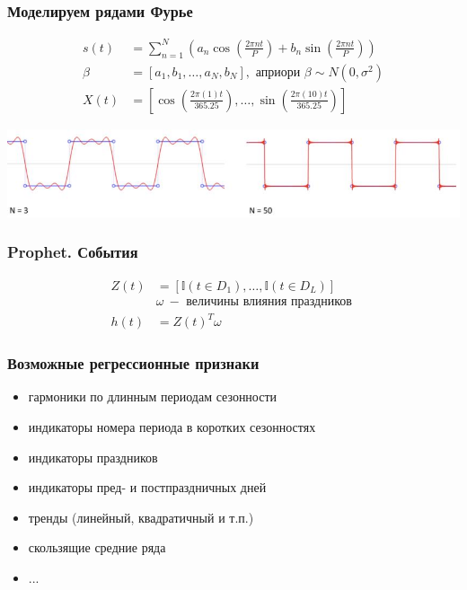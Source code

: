 \documentclass[fullscreen=true, bookmarks=true, hyperref={pdfencoding=unicode}]{beamer}
\begin{document}
\begin{frame}
  \frametitle{Моделируем рядами Фурье}

  \begin{align*}
    s(t) &= \sum\limits_{n=1}^N \left(a_n \cos\left(\frac{2\pi nt}{P}\right) + b_n \sin\left(\frac{2\pi nt}{P} \right) \right) \\
    \beta &= [a_1, b_1, \dots, a_N, b_N], \text{ априори } \beta \sim N(0, \sigma^2)\\
    X(t) &= \left[ \cos\left(\frac{2\pi(1)t}{365.25}\right), \dots, \sin\left(\frac{2\pi(10)t}{365.25}\right) \right]
  \end{align*}

  \vspace{1cm}
  \begin{center}
    \includegraphics[keepaspectratio,
                   width=.8\paperwidth]{fourie.jpg}
  \end{center}

\end{frame}


\begin{frame}
  \frametitle{Prophet. События}

  \begin{align*}
    Z(t) &= [\mathbb{I}(t \in D_1), \dots, \mathbb{I}(t \in D_L)]\\
         &\omega\ - \text{ величины влияния праздников } \\
       h(t) &= Z(t)^T \omega
  \end{align*}

\end{frame}


\begin{frame}
  \frametitle{Возможные регрессионные признаки}

  \begin{itemize}
    \item гармоники по длинным периодам сезонности
    \item индикаторы номера периода в коротких сезонностях
    \item индикаторы праздников
    \item индикаторы пред- и постпраздничных дней
    \item тренды (линейный, квадратичный и т.п.)
    \item скользящие средние ряда
    \item ...
  \end{itemize}

\end{frame}
\end{document}
